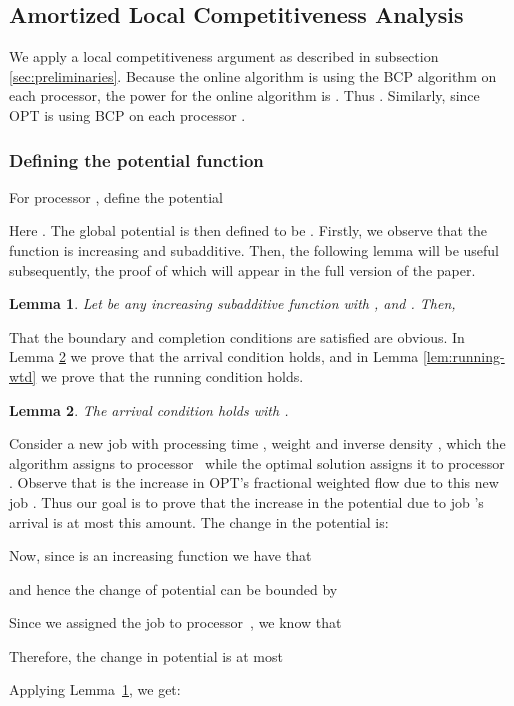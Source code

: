 \documentclass[11pt]{article}
\newtheorem{lemma}{Lemma}[section]
\newenvironment{proof}{\vspace{-0.15in}\noindent{\bf Proof:}}{\hspace*{\fill}\par}
\newcommand{\opt}{\textrm{\sc OPT}\xspace}
\begin{document}
\subsection{Amortized Local Competitiveness Analysis}




We apply a local competitiveness argument as described in subsection \ref{sec:preliminaries}.
Because the online algorithm is using the BCP algorithm on each processor, the power
for the online algorithm is
. Thus . Similarly, since \opt is using BCP on
each processor .

\subsubsection{Defining the potential function}
For processor , define the potential

Here .
The global potential is then defined to be .
Firstly, we observe that the function  is
increasing and subadditive.
Then, the following lemma
will be useful subsequently, the proof of which will appear in the full version of the paper.



\begin{lemma}
  \label{lem:concave-arrival}
  Let  be any increasing subadditive function with , and .
  Then,
  
\end{lemma}

That the boundary and completion conditions are satisfied are obvious.
In Lemma \ref{lem:arrival-wtd} we prove that the arrival condition holds,
and in Lemma \ref{lem:running-wtd} we prove that the running condition holds.




\begin{lemma}
  \label{lem:arrival-wtd}
  The arrival condition holds with .
\end{lemma}
\begin{proof}
Consider a new job  with processing time , weight  and
inverse density , which the algorithm assigns to
processor~ while the optimal solution assigns it to processor .
Observe that  is
the increase in \opt's fractional weighted flow due to this new job .
Thus our goal is to prove that the increase in the potential due to
job 's arrival is at most this amount.
The change in the potential  is:

Now, since  is an increasing function we have that

and hence the change of potential can be bounded by

Since we assigned the job to processor~, we know that

Therefore, the change in potential is at most

Applying Lemma~\ref{lem:concave-arrival}, we get:

\end{proof}
\end{document}
